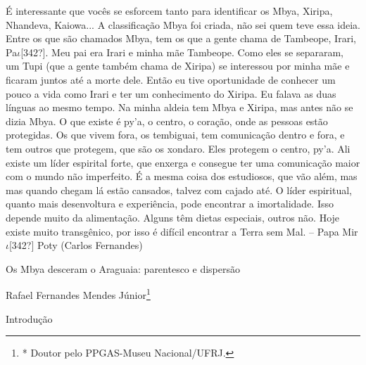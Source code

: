 \documentclass{article}
\begin{document}
\'E interessante que voc\^es se esforcem tanto para identificar os Mbya,
Xiripa, Nhandeva, Kaiowa... A classifica\c{c}\~ao Mbya foi criada,
n\~ao sei quem teve essa ideia. Entre os que s\~ao chamados Mbya, tem
os que a gente chama de Tambeope, Irari, Pa$\iota $[342?]. Meu pai era
Irari e minha m\~ae Tambeope. Como eles se separaram, um Tupi (que a
gente tamb\'em chama de Xiripa) se interessou por minha m\~ae e ficaram
juntos at\'e a morte dele. Ent\~ao eu tive oportunidade de conhecer um
pouco a vida como Irari e ter um conhecimento do Xiripa. Eu falava as
duas l\'inguas ao mesmo tempo. Na minha aldeia tem Mbya e Xiripa, mas
antes n\~ao se dizia Mbya. O que existe \'e py{\textquoteright}a, o
centro, o cora\c{c}\~ao, onde as pessoas est\~ao protegidas. Os que
vivem fora, os tembiguai, tem comunica\c{c}\~ao dentro e fora, e tem
outros que protegem, que s\~ao os xondaro. Eles protegem o centro,
py{\textquoteright}a. Ali existe um l\'ider espirital forte, que
enxerga e consegue ter uma comunica\c{c}\~ao maior com o mundo n\~ao
imperfeito. \'E a mesma coisa dos estudiosos, que v\~ao al\'em, mas mas
quando chegam l\'a est\~ao cansados, talvez com cajado at\'e. O l\'ider
espiritual, quanto mais desenvoltura e experi\^encia, pode encontrar a
imortalidade. Isso depende muito da alimenta\c{c}\~ao. Alguns t\^em
dietas especiais, outros n\~ao. Hoje existe muito transg\^enico, por
isso \'e dif\'icil encontrar a Terra sem Mal. -- Papa Mir$\iota $[342?]
Poty (Carlos Fernandes) 

Os Mbya desceram o Araguaia: parentesco e dispers\~ao

Rafael Fernandes Mendes J\'unior\footnote{* Doutor pelo PPGAS-Museu
Nacional/UFRJ.}

Introdu\c{c}\~ao
\end{document}
